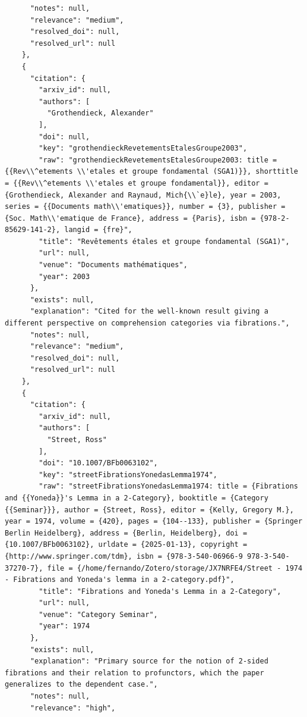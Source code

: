\documentclass[11pt]{article}
\begin{document}
\begin{verbatim}
      "notes": null,
      "relevance": "medium",
      "resolved_doi": null,
      "resolved_url": null
    },
    {
      "citation": {
        "arxiv_id": null,
        "authors": [
          "Grothendieck, Alexander"
        ],
        "doi": null,
        "key": "grothendieckRevetementsEtalesGroupe2003",
        "raw": "grothendieckRevetementsEtalesGroupe2003: title = {{Rev\\^etements \\'etales et groupe fondamental (SGA1)}}, shorttitle = {{Rev\\^etements \\'etales et groupe fondamental}}, editor = {Grothendieck, Alexander and Raynaud, Mich{\\`e}le}, year = 2003, series = {{Documents math\\'ematiques}}, number = {3}, publisher = {Soc. Math\\'ematique de France}, address = {Paris}, isbn = {978-2-85629-141-2}, langid = {fre}",
        "title": "Revêtements étales et groupe fondamental (SGA1)",
        "url": null,
        "venue": "Documents mathématiques",
        "year": 2003
      },
      "exists": null,
      "explanation": "Cited for the well-known result giving a different perspective on comprehension categories via fibrations.",
      "notes": null,
      "relevance": "medium",
      "resolved_doi": null,
      "resolved_url": null
    },
    {
      "citation": {
        "arxiv_id": null,
        "authors": [
          "Street, Ross"
        ],
        "doi": "10.1007/BFb0063102",
        "key": "streetFibrationsYonedasLemma1974",
        "raw": "streetFibrationsYonedasLemma1974: title = {Fibrations and {{Yoneda}}'s Lemma in a 2-Category}, booktitle = {Category {{Seminar}}}, author = {Street, Ross}, editor = {Kelly, Gregory M.}, year = 1974, volume = {420}, pages = {104--133}, publisher = {Springer Berlin Heidelberg}, address = {Berlin, Heidelberg}, doi = {10.1007/BFb0063102}, urldate = {2025-01-13}, copyright = {http://www.springer.com/tdm}, isbn = {978-3-540-06966-9 978-3-540-37270-7}, file = {/home/fernando/Zotero/storage/JX7NRFE4/Street - 1974 - Fibrations and Yoneda's lemma in a 2-category.pdf}",
        "title": "Fibrations and Yoneda's Lemma in a 2-Category",
        "url": null,
        "venue": "Category Seminar",
        "year": 1974
      },
      "exists": null,
      "explanation": "Primary source for the notion of 2-sided fibrations and their relation to profunctors, which the paper generalizes to the dependent case.",
      "notes": null,
      "relevance": "high",

\end{verbatim}
\end{document}
